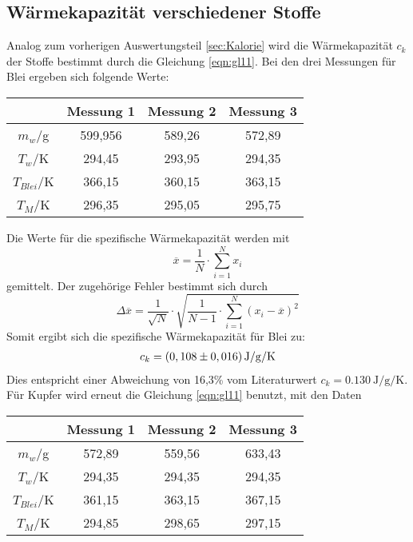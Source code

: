 \subsection{Wärmekapazität verschiedener Stoffe}
\label{sec:verschiedeneStoffe}
Analog zum vorherigen Auswertungsteil \ref{sec:Kalorie} wird die Wärmekapazität $c_k$ der Stoffe bestimmt durch die Gleichung \ref{eqn:gl11}.
Bei den drei Messungen für Blei ergeben sich folgende Werte:
\begin{table}
  \centering
  \label{tab:WerteBlei}
  \begin{tabular}{c c c c}
   \toprule
   & Messung 1 & Messung 2 & Messung 3 \\
   \midrule
   $m_w$/g & 599,956 & 589,26 & 572,89 \\
   $T_w$/K & 294,45 & 293,95 & 294,35 \\
   $T_{Blei}$/K & 366,15 & 360,15 & 363,15 \\
   $T_M$/K & 296,35 & 295,05 & 295,75 \\
   \bottomrule
  \end{tabular}
\end{table}
\newpage
Die Werte für die spezifische Wärmekapazität werden mit
\begin{equation}
  \overline{x} = \frac{1}{N} \cdot \sum_{i=1}^N x_i
\end{equation}
gemittelt. Der zugehörige Fehler bestimmt sich durch 
\begin{equation}
  \Delta \overline{x} = \frac{1}{\sqrt{N}} \cdot \sqrt{\frac{1}{N-1} \cdot \sum_{i=1}^N \left(x_i - \overline{x}\right)^2}
\end{equation}
Somit ergibt sich die spezifische Wärmekapazität für Blei zu:
\begin{align*}
  c_k = \left(0,108 \pm 0,016 \right) \si{{\joule\per\gram\per\kelvin}}
\end{align*}
Dies entspricht einer Abweichung von 16,3\% vom Literaturwert $c_k = \SI{0,130}{\joule\per\gram\per\kelvin}$.
Für Kupfer wird erneut die Gleichung \ref{eqn:gl11} benutzt, mit den Daten
\begin{table}
  \centering
  \label{tab:WerteBlei}
  \begin{tabular}{c c c c}
   \toprule
   & Messung 1 & Messung 2 & Messung 3 \\
   \midrule
   $m_w$/g & 572,89 & 559,56 & 633,43 \\
   $T_w$/K & 294,35 & 294,35 & 294,35 \\
   $T_{Blei}$/K & 361,15 & 363,15 & 367,15 \\
   $T_M$/K & 294,85 & 298,65 & 297,15 \\
   \bottomrule
  \end{tabular}
\end{table}
